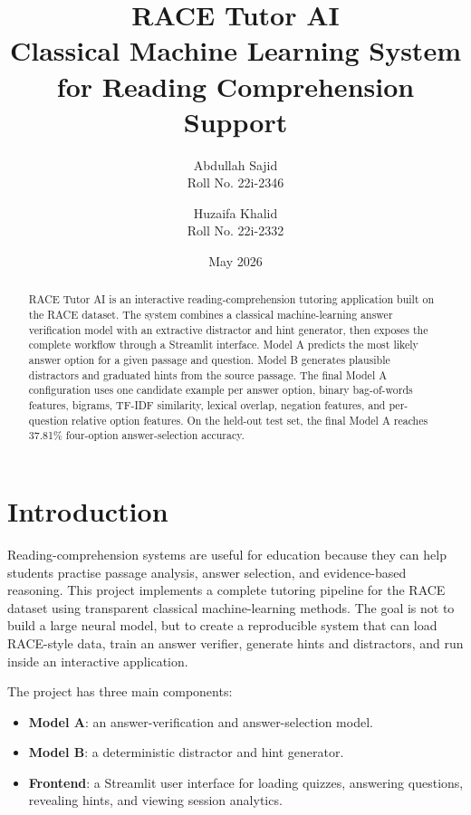 \documentclass[12pt,a4paper]{article}
\title{\textbf{RACE Tutor AI}\\
\large Classical Machine Learning System for Reading Comprehension Support}
\author{
Abdullah Sajid\\
Roll No. 22i-2346
\and
Huzaifa Khalid\\
Roll No. 22i-2332
}
\date{May 2026}
\begin{document}
\maketitle

\begin{abstract}
RACE Tutor AI is an interactive reading-comprehension tutoring application built
on the RACE dataset. The system combines a classical machine-learning answer
verification model with an extractive distractor and hint generator, then exposes
the complete workflow through a Streamlit interface. Model A predicts the most
likely answer option for a given passage and question. Model B generates
plausible distractors and graduated hints from the source passage. The final
Model A configuration uses one candidate example per answer option, binary
bag-of-words features, bigrams, TF-IDF similarity, lexical overlap, negation
features, and per-question relative option features. On the held-out test set,
the final Model A reaches 37.81\% four-option answer-selection accuracy.
\end{abstract}

\tableofcontents
\newpage

\section{Introduction}

Reading-comprehension systems are useful for education because they can help
students practise passage analysis, answer selection, and evidence-based
reasoning. This project implements a complete tutoring pipeline for the RACE
dataset using transparent classical machine-learning methods. The goal is not to
build a large neural model, but to create a reproducible system that can load
RACE-style data, train an answer verifier, generate hints and distractors, and
run inside an interactive application.

The project has three main components:

\begin{itemize}
    \item \textbf{Model A}: an answer-verification and answer-selection model.
    \item \textbf{Model B}: a deterministic distractor and hint generator.
    \item \textbf{Frontend}: a Streamlit user interface for loading quizzes,
    answering questions, revealing hints, and viewing session analytics.
\end{itemize}
\end{document}
